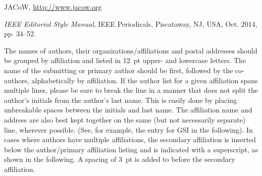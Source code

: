\documentclass[letterpaper,  %
              ]{jacow-2_3}   %
\begin{document}
{{\iffalse  %
	\newpage
	\printbibliography

\else

\begin{thebibliography}{9} %


	JACoW,
	\url{http://www.jacow.org}

	\textit{IEEE Editorial Style Manual},
	IEEE Periodicals, Piscataway,
	NJ, USA, Oct. 2014, pp. 34--52.
\end{thebibliography}

\fi

\newpage


The names of authors, their organizations/affiliations
and postal addresses should be grouped by affiliation and
listed in \SI{12}{pt} upper- and lowercase letters. The name of
the submitting or primary author should be first, followed
by the co-authors, alphabetically by affiliation. If the
author list for a given affiliation spans multiple lines,
please be sure to break the line in a manner that does not
split the author’s initials from the author’s last name. This
is easily done by placing unbreakable spaces between the
initials and last name. The affiliation name and address
are also best kept together on the same (but not necessarily
separate) line, wherever possible. (See, for example,
the entry for GSI in the following). In cases where authors
have multiple affiliations, the secondary affiliation is
inserted below the author/primary affiliation listing and is
indicated with a superscript, as shown in the following. A
spacing of \SI{3}{pt} is added to before the secondary affiliation.

\newpage

}}
\end{document}
